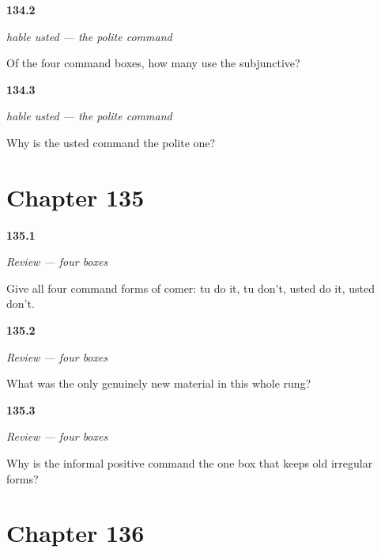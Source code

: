 \noindent\begin{minipage}[t]{\linewidth}
\raggedright
\hypertarget{review-ES-C50-hable-usted-grid}{\textbf{134.2}} \emph{hable usted — the polite command}\par
\small Of the four command boxes, how many use the subjunctive?
\end{minipage}\par\medskip

\noindent\begin{minipage}[t]{\linewidth}
\raggedright
\hypertarget{review-ES-C50-hable-usted-why}{\textbf{134.3}} \emph{hable usted — the polite command}\par
\small Why is the usted command the polite one?
\end{minipage}\par\medskip

\section*{Chapter 135}

\noindent\begin{minipage}[t]{\linewidth}
\raggedright
\hypertarget{review-ES-C50-repaso-mandatos-grid}{\textbf{135.1}} \emph{Review — four boxes}\par
\small Give all four command forms of comer: tu do it, tu don't, usted do it, usted don't.
\end{minipage}\par\medskip

\noindent\begin{minipage}[t]{\linewidth}
\raggedright
\hypertarget{review-ES-C50-repaso-mandatos-cost}{\textbf{135.2}} \emph{Review — four boxes}\par
\small What was the only genuinely new material in this whole rung?
\end{minipage}\par\medskip

\noindent\begin{minipage}[t]{\linewidth}
\raggedright
\hypertarget{review-ES-C50-repaso-mandatos-odd}{\textbf{135.3}} \emph{Review — four boxes}\par
\small Why is the informal positive command the one box that keeps old irregular forms?
\end{minipage}\par\medskip

\section*{Chapter 136}

